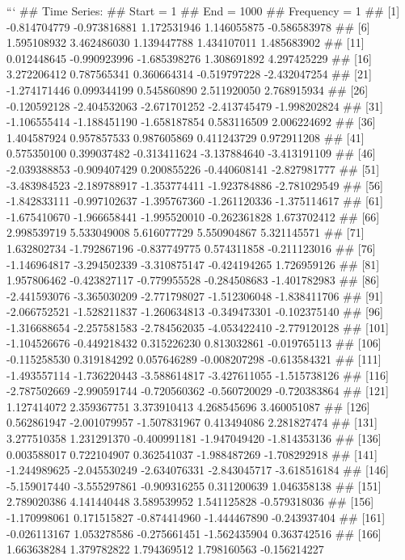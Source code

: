 \documentclass[
]{article}
\begin{document}
\begin{enumerate}[label=(\alph*)]
```
## Time Series:
## Start = 1 
## End = 1000 
## Frequency = 1 
##    [1] -0.814704779 -0.973816881  1.172531946  1.146055875 -0.586583978
##    [6]  1.595108932  3.462486030  1.139447788  1.434107011  1.485683902
##   [11]  0.012448645 -0.990923996 -1.685398276  1.308691892  4.297425229
##   [16]  3.272206412  0.787565341  0.360664314 -0.519797228 -2.432047254
##   [21] -1.274171446  0.099344199  0.545860890  2.511920050  2.768915934
##   [26] -0.120592128 -2.404532063 -2.671701252 -2.413745479 -1.998202824
##   [31] -1.106555414 -1.188451190 -1.658187854  0.583116509  2.006224692
##   [36]  1.404587924  0.957857533  0.987605869  0.411243729  0.972911208
##   [41]  0.575350100  0.399037482 -0.313411624 -3.137884640 -3.413191109
##   [46] -2.039388853 -0.909407429  0.200855226 -0.440608141 -2.827981777
##   [51] -3.483984523 -2.189788917 -1.353774411 -1.923784886 -2.781029549
##   [56] -1.842833111 -0.997102637 -1.395767360 -1.261120336 -1.375114617
##   [61] -1.675410670 -1.966658441 -1.995520010 -0.262361828  1.673702412
##   [66]  2.998539719  5.533049008  5.616077729  5.550904867  5.321145571
##   [71]  1.632802734 -1.792867196 -0.837749775  0.574311858 -0.211123016
##   [76] -1.146964817 -3.294502339 -3.310875147 -0.424194265  1.726959126
##   [81]  1.957806462 -0.423827117 -0.779955528 -0.284508683 -1.401782983
##   [86] -2.441593076 -3.365030209 -2.771798027 -1.512306048 -1.838411706
##   [91] -2.066752521 -1.528211837 -1.260634813 -0.349473301 -0.102375140
##   [96] -1.316688654 -2.257581583 -2.784562035 -4.053422410 -2.779120128
##  [101] -1.104526676 -0.449218432  0.315226230  0.813032861 -0.019765113
##  [106] -0.115258530  0.319184292  0.057646289 -0.008207298 -0.613584321
##  [111] -1.493557114 -1.736220443 -3.588614817 -3.427611055 -1.515738126
##  [116] -2.787502669 -2.990591744 -0.720560362 -0.560720029 -0.720383864
##  [121]  1.127414072  2.359367751  3.373910413  4.268545696  3.460051087
##  [126]  0.562861947 -2.001079957 -1.507831967  0.413494086  2.281827474
##  [131]  3.277510358  1.231291370 -0.400991181 -1.947049420 -1.814353136
##  [136]  0.003588017  0.722104907  0.362541037 -1.988487269 -1.708292918
##  [141] -1.244989625 -2.045530249 -2.634076331 -2.843045717 -3.618516184
##  [146] -5.159017440 -3.555297861 -0.909316255  0.311200639  1.046358138
##  [151]  2.789020386  4.141440448  3.589539952  1.541125828 -0.579318036
##  [156] -1.170998061  0.171515827 -0.874414960 -1.444467890 -0.243937404
##  [161] -0.026113167  1.053278586 -0.275661451 -1.562435904  0.363742516
##  [166]  1.663638284  1.379782822  1.794369512  1.798160563 -0.156214227

\end{enumerate}
\end{document}

